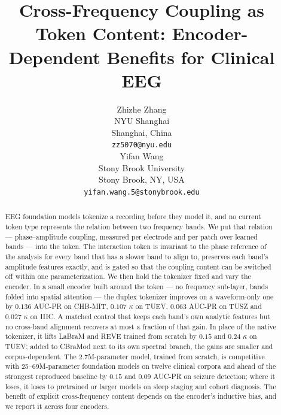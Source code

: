 \documentclass{article} %
\title{Cross-Frequency Coupling as Token Content: Encoder-Dependent Benefits for Clinical EEG}
\author{%
Zhizhe Zhang \\
NYU Shanghai \\
Shanghai, China \\
\texttt{zz5070@nyu.edu} \\
\And
Yifan Wang \\
Stony Brook University \\
Stony Brook, NY, USA \\
\texttt{yifan.wang.5@stonybrook.edu}
}
\begin{document}
\maketitle

\begin{abstract}
EEG foundation models tokenize a recording before they model it, and no
current token type represents the relation between two frequency bands.
We put that relation --- phase--amplitude coupling, measured per electrode
and per patch over learned bands --- into the token. The interaction token
is invariant to the phase reference of the analysis for every band that
has a slower band to align to, preserves each band's amplitude features
exactly, and is gated so that the coupling content can be switched off
within one parameterization. We then hold the tokenizer fixed and vary
the encoder. In a small encoder built around the token --- no frequency
sub-layer, bands folded into spatial attention --- the duplex tokenizer
improves on a waveform-only one by $0.136$ AUC-PR on CHB-MIT, $0.107$
$\kappa$ on TUEV, $0.063$ AUC-PR on TUSZ and $0.027$ $\kappa$ on IIIC. A matched control that keeps each band's own
analytic features but no cross-band alignment recovers at most a fraction
of that gain. In place of the native
tokenizer, it lifts LaBraM and REVE trained from scratch by $0.15$ and
$0.24$ $\kappa$ on TUEV; added to CBraMod next to its own spectral branch,
the gains are smaller and corpus-dependent. The 2.7M-parameter model,
trained from scratch, is competitive with 25--69M-parameter foundation
models on twelve clinical corpora and ahead of the strongest reproduced
baseline by $0.15$ and $0.09$ AUC-PR on seizure detection; where it loses,
it loses to pretrained or larger models on sleep staging and cohort
diagnosis. The benefit of explicit cross-frequency content depends on the
encoder's inductive bias, and we report it across four encoders.
\end{abstract}













\appendix

\end{document}
